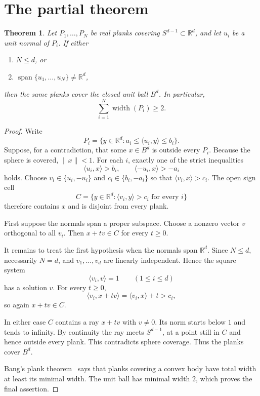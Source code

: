 \documentclass[11pt]{article}
\newtheorem{theorem}{Theorem}
\newcommand{\R}{\mathbb R}
\newcommand{\B}{B^d}
\begin{document}
\clearpage
\section{The partial theorem}

\begin{theorem}\label{thm:main}
Let $P_1,\ldots,P_N$ be real planks covering $S^{d-1}\subset\R^d$, and let
$u_i$ be a unit normal of $P_i$.  If either
\begin{enumerate}
\item $N\le d$, or
\item $\operatorname{span}\{u_1,\ldots,u_N\}\ne\R^d$,
\end{enumerate}
then the same planks cover the closed unit ball $\B$.  In particular,
\[
 \sum_{i=1}^N \operatorname{width}(P_i)\ge2.
\]
\end{theorem}

\begin{proof}
Write
\[
 P_i=\{y\in\R^d:a_i\le\langle u_i,y\rangle\le b_i\}.
\]
Suppose, for a contradiction, that some $x\in\B$ is outside every $P_i$.
Because the sphere is covered, $\|x\|<1$.  For each $i$, exactly one of the
strict inequalities
\[
 \langle u_i,x\rangle>b_i,
 \qquad
 \langle -u_i,x\rangle>-a_i
\]
holds.  Choose $v_i\in\{u_i,-u_i\}$ and $c_i\in\{b_i,-a_i\}$ so that
$\langle v_i,x\rangle>c_i$.  The open sign cell
\[
 C=\{y\in\R^d:\langle v_i,y\rangle>c_i\text{ for every }i\}
\]
therefore contains $x$ and is disjoint from every plank.

First suppose the normals span a proper subspace.  Choose a nonzero vector
$v$ orthogonal to all $v_i$.  Then $x+tv\in C$ for every $t\ge0$.

It remains to treat the first hypothesis when the normals span $\R^d$.
Since $N\le d$, necessarily $N=d$, and $v_1,\ldots,v_d$ are linearly
independent.  Hence the square system
\[
 \langle v_i,v\rangle=1\qquad(1\le i\le d)
\]
has a solution $v$.  For every $t\ge0$,
\[
 \langle v_i,x+tv\rangle=\langle v_i,x\rangle+t>c_i,
\]
so again $x+tv\in C$.

In either case $C$ contains a ray $x+tv$ with $v\ne0$.  Its norm starts below
$1$ and tends to infinity.  By continuity the ray meets $S^{d-1}$, at a point
still in $C$ and hence outside every plank.  This contradicts sphere coverage.
Thus the planks cover $\B$.

Bang's plank theorem~\cite{Bang} says that planks covering a convex body have
total width at least its minimal width.  The unit ball has minimal width $2$,
which proves the final assertion.
\end{proof}
\end{document}
